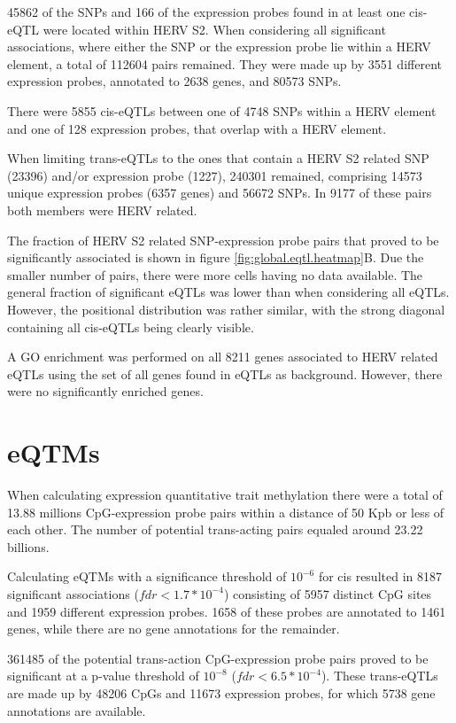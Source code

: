 \documentclass[a4paper,12pt,twoside,openright]{report}
\begin{document}
45862 of the SNPs and 166 of the expression probes found in at least one cis-eQTL were located within HERV S2. When considering all significant associations, where either the SNP or the expression probe lie within a HERV element, a total of 112604 pairs remained. They were made up by 3551 different expression probes, annotated to 2638 genes, and 80573 SNPs. 

There were 5855 cis-eQTLs between one of 4748 SNPs within a HERV element and one of 128 expression probes, that overlap with a HERV element. 

When limiting trans-eQTLs to the ones that contain a HERV S2 related SNP (23396) and/or expression probe (1227), 240301 remained, comprising 14573 unique expression probes (6357 genes) and 56672 SNPs. In 9177 of these pairs both members were HERV related. 

The fraction of HERV S2 related SNP-expression probe pairs that proved to be significantly associated is shown in figure \ref{fig:global.eqtl.heatmap}B. Due the smaller number of pairs, there were more cells having no data available. The general fraction of significant eQTLs was lower than when considering all eQTLs. However, the positional distribution was rather similar, with the strong diagonal containing all cis-eQTLs being clearly visible.  

A GO enrichment was performed on all 8211 genes associated to HERV related eQTLs using the set of all genes found in eQTLs as background. However, there were no significantly enriched genes. 

\section{eQTMs}
\label{Results:eQTMs}
When calculating expression quantitative trait methylation there were a total of 13.88 millions CpG-expression probe pairs within a distance of 50 Kpb or less of each other. The number of potential trans-acting pairs equaled around 23.22 billions. 

Calculating eQTMs with a significance threshold of $10^{-6}$ for cis resulted in 8187 significant associations ($fdr<1.7*10^{-4}$) consisting of 5957 distinct CpG sites and 1959 different expression probes. 1658 of these probes are annotated to 1461 genes, while there are no gene annotations for the remainder. 

361485 of the potential trans-action CpG-expression probe pairs proved to be significant at a p-value threshold of $10^{-8}$ ($fdr<6.5*10^{-4}$). These trans-eQTLs are made up by 48206 CpGs and 11673 expression probes, for which 5738 gene annotations are available. 
\end{document}
